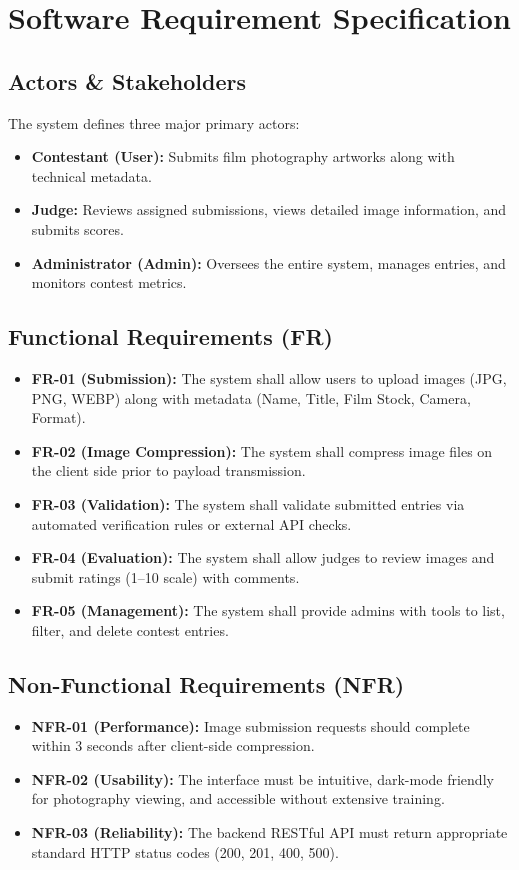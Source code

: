 \chapter{Software Requirement Specification}

\section{Actors \& Stakeholders}
The system defines three major primary actors:
\begin{itemize}
    \item \textbf{Contestant (User):} Submits film photography artworks along with technical metadata.
    \item \textbf{Judge:} Reviews assigned submissions, views detailed image information, and submits scores.
    \item \textbf{Administrator (Admin):} Oversees the entire system, manages entries, and monitors contest metrics.
\end{itemize}

\section{Functional Requirements (FR)}
\begin{itemize}
    \item \textbf{FR-01 (Submission):} The system shall allow users to upload images (JPG, PNG, WEBP) along with metadata (Name, Title, Film Stock, Camera, Format).
    \item \textbf{FR-02 (Image Compression):} The system shall compress image files on the client side prior to payload transmission.
    \item \textbf{FR-03 (Validation):} The system shall validate submitted entries via automated verification rules or external API checks.
    \item \textbf{FR-04 (Evaluation):} The system shall allow judges to review images and submit ratings (1--10 scale) with comments.
    \item \textbf{FR-05 (Management):} The system shall provide admins with tools to list, filter, and delete contest entries.
\end{itemize}

\section{Non-Functional Requirements (NFR)}
\begin{itemize}
    \item \textbf{NFR-01 (Performance):} Image submission requests should complete within 3 seconds after client-side compression.
    \item \textbf{NFR-02 (Usability):} The interface must be intuitive, dark-mode friendly for photography viewing, and accessible without extensive training.
    \item \textbf{NFR-03 (Reliability):} The backend RESTful API must return appropriate standard HTTP status codes (200, 201, 400, 500).
\end{itemize}